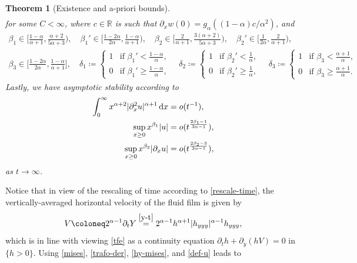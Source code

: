 \documentclass[reqno,12pt]{amsart}
\renewcommand{\d}{\ensuremath{\mathrm{d}}}
\newcommand{\R}{\ensuremath{\mathbb{R}}}
\renewcommand{\d}{\ensuremath{{\rm d}}}
\newtheorem{theorem}{Theorem}[section]
\numberwithin{equation}{section}
\begin{document}
\begin{theorem}[Existence and a-priori bounds]
\begin{align}
\end{align}
%
for some $C < \infty$, where $c \in \R$ is such that $\partial_x w(0) = g_\alpha((1-\alpha) c/\alpha^2)$, and
%
\begin{align*}
\beta_1 \in \Big[\frac{1-\alpha}{\alpha+1},\frac{\alpha+2}{5\alpha+3}\Big), \quad \beta_1' \in \Big[\frac{1-2\alpha}{2\alpha},\frac{1-\alpha}{\alpha+1}\Big), \quad \beta_2 \in \Big[\frac{2}{\alpha+1},\frac{3(\alpha+2)}{5\alpha +3}\Big), \quad \beta_2' \in \Big[\frac{1}{2\alpha}, \frac{2}{\alpha+1}\Big), \\
\beta_3 \in \Big[\frac{1-2\alpha}{2\alpha},\frac{1-\alpha}{\alpha+1}\Big], \quad \delta_1 \coloneq \begin{cases} 1 & \text{if } \beta_1' < \frac{1-\alpha}{\alpha}, \\ 0 & \text{if } \beta_1' \ge \frac{1-\alpha}{\alpha}, \end{cases} \quad \delta_2 \coloneq \begin{cases} 1 & \text{if } \beta_2' < \frac 1 \alpha, \\ 0 & \text{if } \beta_2' \ge \frac 1 \alpha, \end{cases} \quad \delta_3 \coloneq \begin{cases} 1 & \text{if } \beta_3 < \frac{\alpha+1}{\alpha}, \\ 0 & \text{if }  \beta_3 \ge \frac{\alpha+1}{\alpha}. \end{cases}
\end{align*}
%
Lastly, we have asymptotic stability according to 
%
\begin{subequations}
\begin{align}\label{decay-main}
\int_0^\infty
x^{\alpha+2} |\partial_x^2 u|^{\alpha+1}
\, \d x &= o(t^{-1}), \\
\sup_{x \ge 0} x^{\beta_1} |u| &=
o(t^{\frac{2\beta_1-1}{3\alpha-1}}),
\label{decay-xbu}\\
\sup_{x \ge 0} x^{\beta_2} |\partial_x u| &= o(t^{\frac{2\beta_2-3}{3\alpha-1}}),
\label{decay-xbu'}
\end{align}
\end{subequations}
%
as $t \to \infty$.
\end{theorem}
%
Notice that in view of the rescaling of time according to \eqref{rescale-time}, the vertically-averaged horizontal velocity of the fluid film is given by
%
\[
V \coloneq 2^{\alpha-1} \partial_t Y \stackrel{\eqref{y-t}}{=} 2^{\alpha-1} h^{\alpha+1} |h_{yyy}|^{\alpha-1} h_{yyy},
\]
%
which is in line with viewing \eqref{tfe} as a continuity equation $\partial_t h + \partial_y (h V) = 0$ in $\{h > 0\}$. Using \eqref{mises}, \eqref{trafo-der}, \eqref{hy-mises}, and \eqref{def-u} leads to
\end{document}

